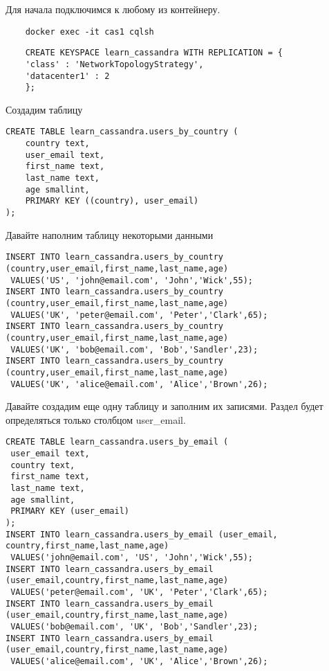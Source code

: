 Для начала подключимся к любому из контейнеру.
\begin{verbatim}
	docker exec -it cas1 cqlsh
\end{verbatim}

\begin{verbatim}
	CREATE KEYSPACE learn_cassandra WITH REPLICATION = {
	'class' : 'NetworkTopologyStrategy',
	'datacenter1' : 2
	};
\end{verbatim}


Создадим таблицу
\begin{verbatim}
CREATE TABLE learn_cassandra.users_by_country (
	country text,
	user_email text,
	first_name text,
	last_name text,
	age smallint,
	PRIMARY KEY ((country), user_email)
);
\end{verbatim}

Давайте наполним таблицу некоторыми данными
\begin{verbatim}
INSERT INTO learn_cassandra.users_by_country
(country,user_email,first_name,last_name,age)
 VALUES('US', 'john@email.com', 'John','Wick',55);
INSERT INTO learn_cassandra.users_by_country
(country,user_email,first_name,last_name,age)
 VALUES('UK', 'peter@email.com', 'Peter','Clark',65);
INSERT INTO learn_cassandra.users_by_country
(country,user_email,first_name,last_name,age)
 VALUES('UK', 'bob@email.com', 'Bob','Sandler',23);
INSERT INTO learn_cassandra.users_by_country
(country,user_email,first_name,last_name,age)
 VALUES('UK', 'alice@email.com', 'Alice','Brown',26);
\end{verbatim}

Давайте создадим еще одну таблицу и заполним их записями.
Раздел будет определяться только столбцом user\_email.

\begin{verbatim}
CREATE TABLE learn_cassandra.users_by_email (
 user_email text,
 country text,
 first_name text,
 last_name text,
 age smallint,
 PRIMARY KEY (user_email)
);
INSERT INTO learn_cassandra.users_by_email (user_email,
country,first_name,last_name,age)
 VALUES('john@email.com', 'US', 'John','Wick',55);
INSERT INTO learn_cassandra.users_by_email
(user_email,country,first_name,last_name,age)
 VALUES('peter@email.com', 'UK', 'Peter','Clark',65);
INSERT INTO learn_cassandra.users_by_email
(user_email,country,first_name,last_name,age)
 VALUES('bob@email.com', 'UK', 'Bob','Sandler',23);
INSERT INTO learn_cassandra.users_by_email
(user_email,country,first_name,last_name,age)
 VALUES('alice@email.com', 'UK', 'Alice','Brown',26);
\end{verbatim}

